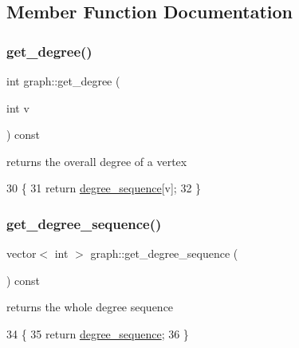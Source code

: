 \subsection{Member Function Documentation}
\mbox{\label{classgraph_a593245054bf5ded344fbf304bcdc7fbe}} 
\subsubsection{\texorpdfstring{get\+\_\+degree()}{get\_degree()}}
{\footnotesize\ttfamily int graph\+::get\+\_\+degree (\begin{DoxyParamCaption}\item[{int}]{v }\end{DoxyParamCaption}) const}



returns the overall degree of a vertex 


\begin{DoxyCode}
30                                 \{
31   \textcolor{keywordflow}{return} \hyperlink{classgraph_a0b31295672bfe37669c9eb3640977fe6}{degree\_sequence}[v];
32 \}
\end{DoxyCode}
\mbox{\label{classgraph_afdca627df7fb93a7d1d8a547f616e948}} 
\subsubsection{\texorpdfstring{get\+\_\+degree\+\_\+sequence()}{get\_degree\_sequence()}}
{\footnotesize\ttfamily vector$<$ int $>$ graph\+::get\+\_\+degree\+\_\+sequence (\begin{DoxyParamCaption}{ }\end{DoxyParamCaption}) const}



returns the whole degree sequence 


\begin{DoxyCode}
34                                             \{
35   \textcolor{keywordflow}{return} \hyperlink{classgraph_a0b31295672bfe37669c9eb3640977fe6}{degree\_sequence};
36 \}
\end{DoxyCode}
\mbox{\label{classgraph_a388b6ce292a4c49e3853e22bdce978de}} 
